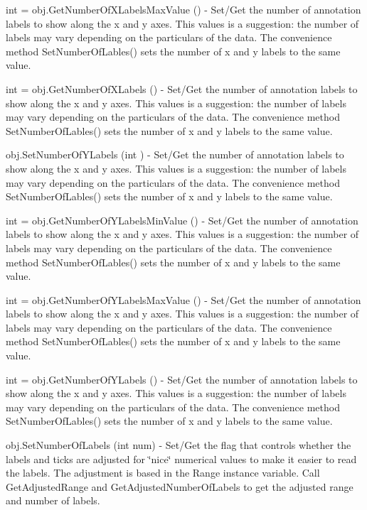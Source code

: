 \begin{DoxyItemize}
\item {\ttfamily int = obj.\-Get\-Number\-Of\-X\-Labels\-Max\-Value ()} -\/ Set/\-Get the number of annotation labels to show along the x and y axes. This values is a suggestion\-: the number of labels may vary depending on the particulars of the data. The convenience method Set\-Number\-Of\-Lables() sets the number of x and y labels to the same value.  
\item {\ttfamily int = obj.\-Get\-Number\-Of\-X\-Labels ()} -\/ Set/\-Get the number of annotation labels to show along the x and y axes. This values is a suggestion\-: the number of labels may vary depending on the particulars of the data. The convenience method Set\-Number\-Of\-Lables() sets the number of x and y labels to the same value.  
\item {\ttfamily obj.\-Set\-Number\-Of\-Y\-Labels (int )} -\/ Set/\-Get the number of annotation labels to show along the x and y axes. This values is a suggestion\-: the number of labels may vary depending on the particulars of the data. The convenience method Set\-Number\-Of\-Lables() sets the number of x and y labels to the same value.  
\item {\ttfamily int = obj.\-Get\-Number\-Of\-Y\-Labels\-Min\-Value ()} -\/ Set/\-Get the number of annotation labels to show along the x and y axes. This values is a suggestion\-: the number of labels may vary depending on the particulars of the data. The convenience method Set\-Number\-Of\-Lables() sets the number of x and y labels to the same value.  
\item {\ttfamily int = obj.\-Get\-Number\-Of\-Y\-Labels\-Max\-Value ()} -\/ Set/\-Get the number of annotation labels to show along the x and y axes. This values is a suggestion\-: the number of labels may vary depending on the particulars of the data. The convenience method Set\-Number\-Of\-Lables() sets the number of x and y labels to the same value.  
\item {\ttfamily int = obj.\-Get\-Number\-Of\-Y\-Labels ()} -\/ Set/\-Get the number of annotation labels to show along the x and y axes. This values is a suggestion\-: the number of labels may vary depending on the particulars of the data. The convenience method Set\-Number\-Of\-Lables() sets the number of x and y labels to the same value.  
\item {\ttfamily obj.\-Set\-Number\-Of\-Labels (int num)} -\/ Set/\-Get the flag that controls whether the labels and ticks are adjusted for \char`\"{}nice\char`\"{} numerical values to make it easier to read the labels. The adjustment is based in the Range instance variable. Call Get\-Adjusted\-Range and Get\-Adjusted\-Number\-Of\-Labels to get the adjusted range and number of labels.  

\end{DoxyItemize}
